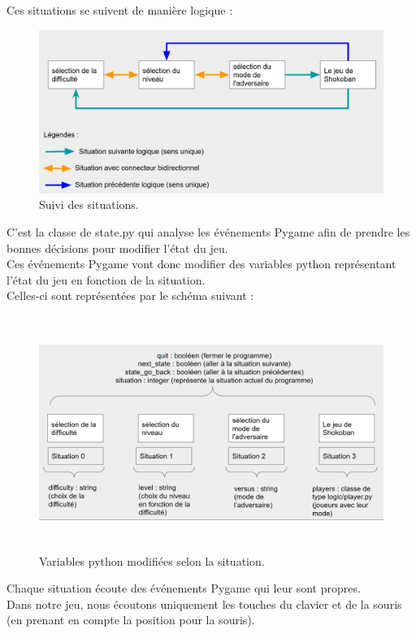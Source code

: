 \documentclass[a4paper,12pt]{article}
\begin{document}
Ces situations se suivent de manière logique :\\

\begin{figure}[H]
\includegraphics[width=\linewidth]{./Illustrations/state_2.png}
\caption{Suivi des situations.}
\end{figure}

C'est la classe de state.py qui analyse les événements Pygame afin de prendre les bonnes décisions pour modifier l'état du jeu.\\
Ces événements Pygame vont donc modifier des variables python représentant l'état du jeu en fonction de la situation.\\

Celles-ci sont représentées par le schéma suivant :

\begin{figure}[H]
\includegraphics[width=\linewidth, height=3in]{./Illustrations/state_3.png}
\caption{Variables python modifiées selon la situation.}
\end{figure}

Chaque situation écoute des événements Pygame qui leur sont propres.\\
Dans notre jeu, nous écoutons uniquement les touches du clavier et de la souris (en prenant en compte la position pour la souris).
\end{document}

